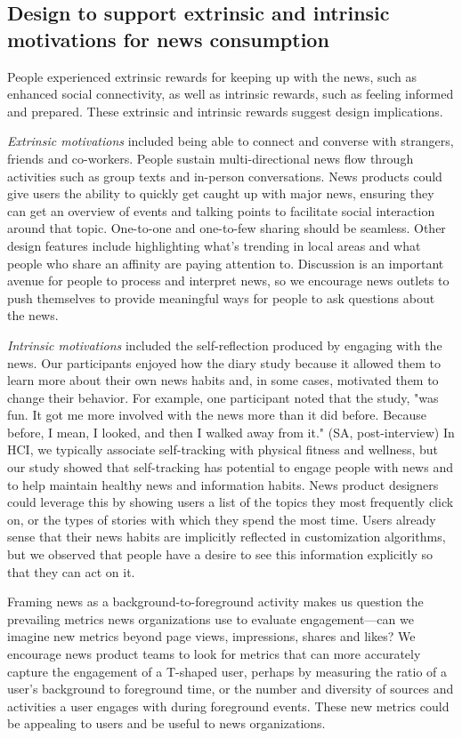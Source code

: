 \documentclass[sigchi]{acmart}
\begin{document}
\subsection{Design to support extrinsic and intrinsic motivations for news consumption}
People experienced extrinsic rewards for keeping up with the news, such as enhanced social connectivity, as well as intrinsic rewards, such as feeling informed and prepared. These extrinsic and intrinsic rewards suggest design implications.

\textit{Extrinsic motivations} included being able to connect and converse with strangers, friends and co-workers. People sustain multi-directional news flow through activities such as group texts and in-person conversations. News products could give users the ability to quickly get caught up with major news, ensuring they can get an overview of events and talking points to facilitate social interaction around that topic. One-to-one and one-to-few sharing should be seamless. Other design features include highlighting what's trending in local areas and what people who share an affinity are paying attention to. Discussion is an important avenue for people to process and interpret news, so we encourage news outlets to push themselves to provide meaningful ways for people to ask questions about the news.

\textit{Intrinsic motivations} included the self-reflection produced by engaging with the news. Our participants enjoyed how the diary study because it allowed them to learn more about their own news habits and, in some cases, motivated them to change their behavior. For example, one participant noted that the study, "was fun. It got me more involved with the news more than it did before. Because before, I mean, I looked, and then I walked away from it." (SA, post-interview) In HCI, we typically associate self-tracking with physical fitness and wellness, but our study showed that self-tracking has potential to engage people with news and to help maintain healthy news and information habits. News product designers could leverage this by showing users a list of the topics they most frequently click on, or the types of stories with which they spend the most time. Users already sense that their news habits are implicitly reflected in customization algorithms, but we observed that people have a desire to see this information explicitly so that they can act on it.

Framing news as a background-to-foreground activity makes us question the prevailing metrics news organizations use to evaluate engagement—can we imagine new metrics beyond page views, impressions, shares and likes? We encourage news product teams to look for metrics that can more accurately capture the engagement of a T-shaped user, perhaps by measuring the ratio of a user's background to foreground time, or the number and diversity of sources and activities a user engages with during foreground events. These new metrics could be appealing to users and be useful to news organizations.
\end{document}
